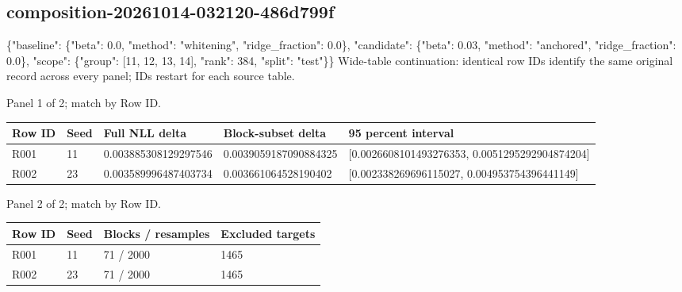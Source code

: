 \documentclass[10pt]{article}
\begin{document}
\subsection{composition-20261014-032120-486d799f}
\{"baseline": \{"beta": 0.0, "method": "whitening", "ridge\_fraction": 0.0\}, "candidate": \{"beta": 0.03, "method": "anchored", "ridge\_fraction": 0.0\}, "scope": \{"group": [11, 12, 13, 14], "rank": 384, "split": "test"\}\}
Wide-table continuation: identical row IDs identify the same original record across every panel; IDs restart for each source table.
\par\noindent Panel 1 of 2; match by Row ID.
{\scriptsize\setlength{\tabcolsep}{2pt}
\begin{longtable}{p{}p{}p{}p{}p{}}
Row ID & Seed & Full NLL delta & Block-subset delta & 95 percent interval \\
\hline\endhead
R001 & 11 & 0.003885308129297546 & 0.0039059187090884325 & [0.0026608101493276353, 0.0051295292904874204] \\
R002 & 23 & 0.003589996487403734 & 0.003661064528190402 & [0.002338269696115027, 0.004953754396441149] \\
\end{longtable}}
\par\noindent Panel 2 of 2; match by Row ID.
{\scriptsize\setlength{\tabcolsep}{2pt}
\begin{longtable}{p{}p{}p{}p{}}
Row ID & Seed & Blocks / resamples & Excluded targets \\
\hline\endhead
R001 & 11 & 71 / 2000 & 1465 \\
R002 & 23 & 71 / 2000 & 1465 \\
\end{longtable}}
\end{document}
